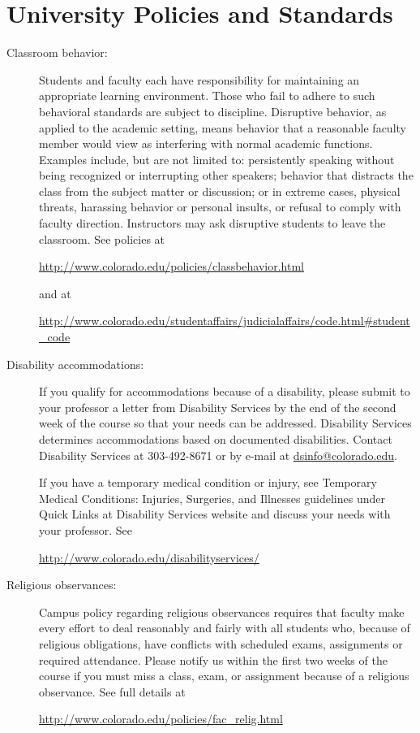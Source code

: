 \documentclass[11pt]{article}
\begin{document}
\section*{University Policies and Standards}

\begin{description}
\item[Classroom behavior:] Students and faculty each have
  responsibility for maintaining an appropriate learning
  environment. Those who fail to adhere to such behavioral standards
  are subject to discipline.  Disruptive behavior, as applied to the
  academic setting, means behavior that a reasonable faculty member
  would view as interfering with normal academic functions. Examples
  include, but are not limited to: persistently speaking without being
  recognized or interrupting other speakers; behavior that distracts
  the class from the subject matter or discussion; or in extreme
  cases, physical threats, harassing behavior or personal insults, or
  refusal to comply with faculty direction. Instructors may ask
  disruptive students to leave the classroom.  See policies at
  \begin{center}
    \url{http://www.colorado.edu/policies/classbehavior.html}
  \end{center}
  and at
  \begin{center} \url{http://www.colorado.edu/studentaffairs/judicialaffairs/code.html#student_code}
  \end{center}

\item[Disability accommodations:] If you qualify for accommodations
  because of a disability, please submit to your professor a letter
  from Disability Services by the end of the second week of the course
  so that your needs can be addressed. Disability Services determines
  accommodations based on documented disabilities. Contact Disability
  Services at 303-492-8671 or by e-mail at
  \href{mailto:dsinfo@colorado.edu}{dsinfo@colorado.edu}.

  If you have a temporary medical condition or injury, see Temporary
  Medical Conditions: Injuries, Surgeries, and Illnesses guidelines
  under Quick Links at Disability Services website and discuss your
  needs with your professor. See
  \begin{center}
    \url{http://www.colorado.edu/disabilityservices/}
  \end{center}

\item[Religious observances:] Campus policy regarding religious
  observances requires that faculty make every effort to deal
  reasonably and fairly with all students who, because of religious
  obligations, have conflicts with scheduled exams, assignments or
  required attendance.  Please notify us within the first two weeks of
  the course if you must miss a class, exam, or assignment because of
  a religious observance.  See full details at
  \begin{center}
    \url{http://www.colorado.edu/policies/fac_relig.html}
  \end{center}


\end{description}
\end{document}
